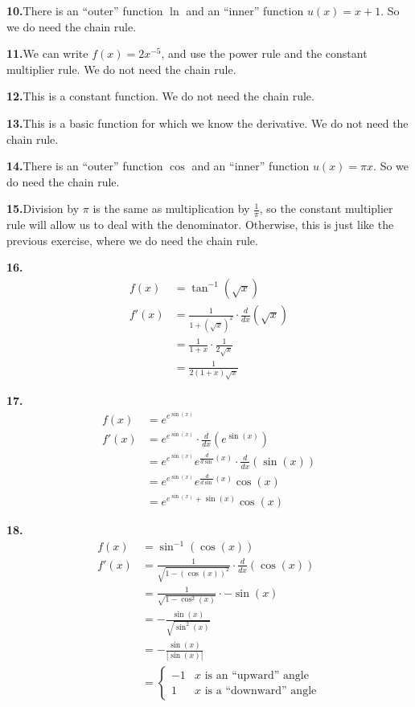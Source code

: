 \documentclass[10pt,oneside,]{book}
\theoremstyle{plain}
\theoremstyle{definition}
\numberwithin{equation}{section}
\newcommand{\fe}[2]{#1\mathopen{}\left(#2\right)\mathclose{}}
\newcommand{\fd}[1]{#1'}
\newcommand{\lzoo}[2]{{\frac{d}{d#1}}{\left(#2\right)}}
\newcommand{\abs}[1]{\left|#1\right|}
\begin{document}
\par\smallskip
\noindent\textbf{10.}\quad{}There is an ``outer'' function \(\ln\) and an ``inner'' function \(\fe{u}{x}=x+1\). So we do need the chain rule.%
\par\smallskip
\noindent\textbf{11.}\quad{}We can write \(\fe{f}{x}=2x^{-5}\), and use the power rule and the constant multiplier rule. We do not need the chain rule.%
\par\smallskip
\noindent\textbf{12.}\quad{}This is a constant function. We do not need the chain rule.%
\par\smallskip
\noindent\textbf{13.}\quad{}This is a basic function for which we know the derivative. We do not need the chain rule.%
\par\smallskip
\noindent\textbf{14.}\quad{}There is an ``outer'' function \(\cos\) and an ``inner'' function \(\fe{u}{x}=\pi x\). So we do need the chain rule.%
\par\smallskip
\noindent\textbf{15.}\quad{}Division by \(\pi\) is the same as multiplication by \(\frac{1}{\pi}\), so the constant multiplier rule will allow us to deal with the denominator. Otherwise, this is just like the previous exercise, where we do need the chain rule.%
\par\smallskip
\noindent\textbf{16.}\quad{}\begin{align*}
\fe{f}{x}&=\fe{\tan^{-1}}{\sqrt{x}}\\
\fe{\fd{f}}{x}&=\frac{1}{1+\left(\sqrt{x}\right)^2}\cdot\lzoo{x}{\sqrt{x}}\\
&=\frac{1}{1+x}\cdot\frac{1}{2\sqrt{x}}\\
&=\frac{1}{2(1+x)\sqrt{x}}
\end{align*}%
\par\smallskip
\noindent\textbf{17.}\quad{}\begin{align*}
\fe{f}{x}&=e^{e^{\fe{\sin}{x}}}\\
\fe{\fd{f}}{x}&=e^{e^{\fe{\sin}{x}}}\cdot\lzoo{x}{e^{\fe{\sin}{x}}}\\
&=e^{e^{\fe{\sin}{x}}}e^{\lzoo{\sin}{x}}\cdot\lzoo{x}{\fe{\sin}{x}}\\
&=e^{e^{\fe{\sin}{x}}}e^{\lzoo{\sin}{x}}\fe{\cos}{x}\\
&=e^{e^{\fe{\sin}{x}}+\fe{\sin}{x}}\fe{\cos}{x}
\end{align*}%
\par\smallskip
\noindent\textbf{18.}\quad{}\begin{align*}
\fe{f}{x}&=\fe{\sin^{-1}}{\fe{\cos}{x}}\\
\fe{\fd{f}}{x}&=\frac{1}{\sqrt{1-\left(\fe{\cos}{x}\right)^2}}\cdot\lzoo{x}{\fe{\cos}{x}}\\
&=\frac{1}{\sqrt{1-\fe{\cos^2}{x}}}\cdot-\fe{\sin}{x}\\
&=-\frac{\fe{\sin}{x}}{\sqrt{\fe{\sin^2}{x}}}\\
&=-\frac{\fe{\sin}{x}}{\abs{\fe{\sin}{x}}}\\
&=\begin{cases}-1&\text{$x$ is an ``upward'' angle}\\1&\text{$x$ is a ``downward'' angle}\end{cases}
\end{align*}%
\end{document}
